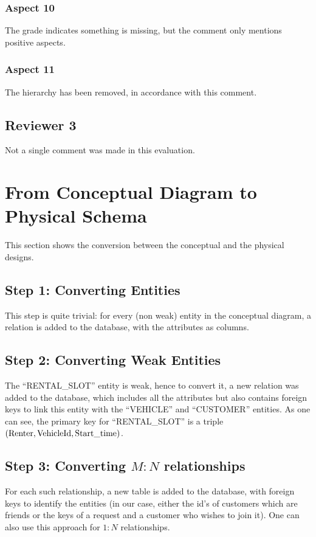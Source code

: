 \documentclass[journal, 9pt]{IEEEtran}
\theoremstyle{definition}
\begin{document}
\subsubsection{Aspect 10}
The grade indicates something is missing, but the comment only mentions positive aspects.

\subsubsection{Aspect 11}
The hierarchy has been removed, in accordance with this comment.

\subsection{Reviewer 3}
Not a single comment was made in this evaluation.

\section{From Conceptual Diagram to Physical Schema}
This section shows the conversion between the conceptual and the physical designs.

\subsection{Step 1: Converting Entities}
This step is quite trivial: for every (non weak) entity in the conceptual diagram, a relation is added to the database, with the attributes as columns.

\subsection{Step 2: Converting Weak Entities}
The ``RENTAL\_SLOT'' entity is weak, hence to convert it, a new relation was added to the database, which includes all the attributes but also contains foreign keys to link this entity with the ``VEHICLE'' and ``CUSTOMER'' entities.
As one can see, the primary key for ``RENTAL\_SLOT'' is a triple \((\textnormal{Renter}, \textnormal{VehicleId}, \textnormal{Start\_time})\).

\subsection{Step 3: Converting \(M:N\) relationships}
For each such relationship, a new table is added to the database, with foreign keys to identify the entities (in our case, either the id's of customers which are friends or the keys of a request and a customer who wishes to join it).
One can also use this approach for \(1:N\) relationships.
\end{document}
